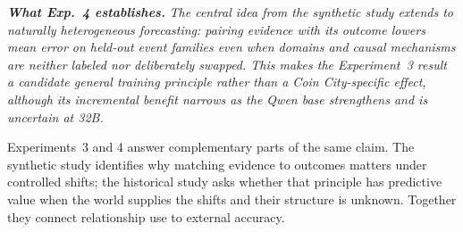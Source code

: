 \noindent\textbf{\emph{What Exp.~4 establishes.}}
\emph{The central idea from the synthetic study extends to naturally
heterogeneous forecasting: pairing evidence with its outcome lowers mean error
on held-out event families even when domains and causal mechanisms are neither
labeled nor deliberately swapped. This makes the Experiment~3 result a candidate
general training principle rather than a Coin City-specific effect, although its
incremental benefit narrows as the Qwen base strengthens and is uncertain at
32B.}

Experiments~3 and 4 answer complementary parts of the same claim. The synthetic
study identifies why matching evidence to outcomes matters under controlled
shifts; the historical study asks whether that principle has predictive value
when the world supplies the shifts and their structure is unknown. Together they
connect relationship use to external accuracy.
